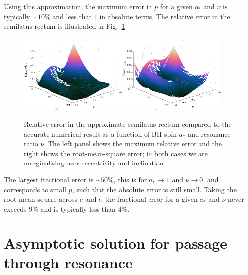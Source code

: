 \documentclass[aps,prd,amsfonts,amssymb,amsmath,nofootinbib,showpacs,superscriptaddress,twocolumn,floatfix]{revtex4-1}
\newcommand{\figref}[1]{Fig.~\ref{fig:#1}}
\begin{document}
Using this approximation, the maximum error in $p$ for a given $a_\ast$ and $\nu$ is typically $\sim10\%$ and less that $1$ in absolute terms. The relative error in the semilatus rectum is illustrated in \figref{p-error}. 
\begin{figure}[htp]
\centering
\centerline{\includegraphics[width=0.47\textwidth]{Fig_fit-error-max-plane}\quad\includegraphics[width=0.47\textwidth]{Fig_fit-error-RMS-plane}}
\caption{\label{fig:p-error}Relative error in the approximate semilatus rectum compared to the accurate numerical result as a function of BH spin $a_\ast$ and resonance ratio $\nu$. The left panel shows the maximum relative error and the right shows the root-mean-square error; in both cases we are marginalising over eccentricity and inclination.}
\end{figure}
The largest fractional error is $\sim50\%$, this is for $a_\ast \rightarrow 1$ and $\nu \rightarrow 0$, and corresponds to small $p$, such that the absolute error is still small. Taking the root-mean-square across $e$ and $\iota$, the fractional error for a given $a_\ast$ and $\nu$ never exceeds $9\%$ and is typically less than $4\%$.

\section{Asymptotic solution for passage through resonance}\label{sec:res-asymptotic}




\end{document}
